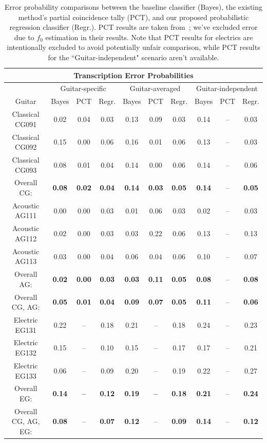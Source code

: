 \documentclass[12pt]{cmuthesis}
\begin{document}
\begin{table}[!htbp]
\begin{center}
\begin{tabular} {||c||c|c|c||c|c|c||c|c|c||}
\hline
\multicolumn{10}{||c||}{\bf{Transcription Error Probabilities}} \\
\hline
 & \multicolumn{3}{|c||}{Guitar-specific} & \multicolumn{3}{|c||}{Guitar-averaged}& \multicolumn{3}{|c||}{Guitar-independent}\\
\hline
Guitar & Bayes & PCT & Regr. & Bayes & PCT & Regr. & Bayes & PCT & Regr.\\
\hline
\hline
Classical CG091 & 0.02 & 0.04 & 0.03 & 0.13 & 0.09 & 0.03 & 0.14 & -- & 0.03 \\
\hline
Classical CG092 & 0.15 & 0.00 & 0.06 & 0.16 & 0.01 & 0.06 & 0.13 & -- & 0.03 \\
\hline
Classical CG093 & 0.08 & 0.01 & 0.04 & 0.14 & 0.00 & 0.06 & 0.14 & -- & 0.06 \\
\hline
Overall CG: & \bf{0.08} & \bf{0.02}  & \bf{0.04} & \bf{0.14} & \bf{0.03} & \bf{0.05} & \bf{0.14} & -- & \bf{0.05}\\
\hline
\hline
Acoustic AG111 & 0.00 & 0.00 & 0.03 & 0.01 & 0.06 & 0.03 & 0.02 & -- & 0.03 \\
\hline
Acoustic AG112 & 0.02 & 0.00 & 0.03 & 0.03 & 0.22 & 0.06 & 0.13 & -- & 0.13 \\
\hline
Acoustic AG113  & 0.03 & 0.00 & 0.04 & 0.06 & 0.04 & 0.06 & 0.10 & -- & 0.07\\
\hline
Overall AG: & \bf{0.02} & \bf{0.00} & \bf{0.03} & \bf{0.03} & \bf{0.11} & \bf{0.05} & \bf{0.08} & -- & \bf{0.08}\\
\hline
\hline
\hline
Overall CG, AG: & \bf{0.05} & \bf{0.01} & \bf{0.04} & \bf{0.09} & \bf{0.07} & \bf{0.05} & \bf{0.11} & -- & \bf{0.06}\\
\hline
\hline
\hline
Electric EG131 & 0.22 & -- & 0.18 & 0.21 & -- & 0.18 & 0.24 & -- & 0.23\\
\hline
Electric EG132 & 0.15 & -- & 0.10 & 0.15 & -- & 0.17 & 0.17 & -- & 0.21\\
\hline
Electric EG133 & 0.06 & -- & 0.09 & 0.20 & --  & 0.19 & 0.22 & -- & 0.27 \\
\hline
Overall EG: & \bf{0.14} & \bf{--} & \bf{0.12} & \bf{0.19} & \bf{--} & \bf{0.18} & \bf{0.21} & -- & \bf{0.24}\\
\hline
\hline
\hline
Overall CG, AG, EG: & \bf{0.08} & -- & \bf{0.07} & \bf{0.12} & -- & \bf{0.09} & \bf{0.14} & -- & \bf{0.12}\\
\hline
\end{tabular}
\caption{Error probability comparisons between the baseline classifier (Bayes), the existing method's partial coincidence tally (PCT), and our proposed probabilistic regression classifier (Regr.). PCT results are taken from~\cite{barbanchoi2012}; we've excluded error due to $f_0$ estimation in their results. Note that PCT results for electrics are intentionally excluded to avoid potentially unfair comparison, while PCT results for the ``Guitar-independent" scenario aren't available.}
\label{tab:error-results-RWC}
\end{center}
\end{table}
\end{document}
